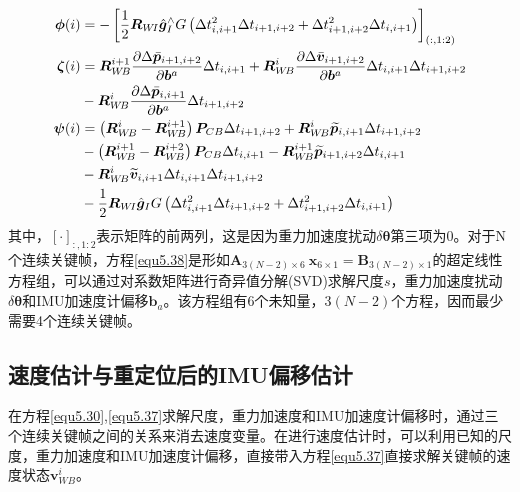 \begin{equation}
\label{equ5.39}
\begin{aligned}
\boldsymbol{\phi} (i)  &= - \left[ {1 \over 2} \boldsymbol{R}_{W\!I}\hat{\boldsymbol{g}}_I^{\wedge} G \left( \Delta t_{i,i+1}^2 \Delta t_{i+1,i+2}+  \Delta t_{i+1,i+2}^2 \Delta t_{i,i+1} \right) \right]_{(:,1:2)}
\\ 
\boldsymbol{\zeta} (i) &=  \boldsymbol{R}_{W\!B}^{i+1} {\partial \Delta \bar{\boldsymbol{p}}_{i+1,i+2} \over \partial \boldsymbol{b}^a } \Delta t_{i,i+1} + \boldsymbol{R}_{W\!B}^i {\partial \Delta \bar{\boldsymbol{v}}_{i+1,i+2} \over \partial \boldsymbol{b}^a } \Delta t_{i,i+1} \Delta t_{i+1,i+2} \\
 &- \boldsymbol{R}_{W\!B}^{i} {\partial \Delta \bar{\boldsymbol{p}}_{i,i+1} \over \partial \boldsymbol{b}^a } \Delta t_{i+1,i+2} 
\\  
\boldsymbol{\psi} (i) & = \left( \boldsymbol{R}_{W\!B}^{i} - \boldsymbol{R}_{W\!B}^{i+1} \right) \boldsymbol{P}_{CB} \Delta t_{i+1,i+2} + \boldsymbol{R}_{W\!B}^{i} \widetilde{\boldsymbol{p}}_{i,i+1} \Delta t_{i+1,i+2} \\
& - \left( \boldsymbol{R}_{W\!B}^{i+1} - \boldsymbol{R}_{W\!B}^{i+2} \right) \boldsymbol{P}_{CB} \Delta t_{i,i+1} - \boldsymbol{R}_{W\!B}^{i+1} \widetilde{\boldsymbol{p}}_{i+1,i+2} \Delta t_{i,i+1} \\ 
& - \boldsymbol{R}_{W\!B}^{i} \widetilde{\boldsymbol{v}}_{i,i+1}  \Delta t_{i,i+1} \Delta t_{i+1,i+2} \\
& - {1 \over 2} \boldsymbol{R}_{W\!I} \hat{\boldsymbol{g}}_I G \left( \Delta t_{i,i+1}^2 \Delta t_{i+1,i+2} + \Delta t_{i+1,i+2}^2 \Delta t_{i,i+1} \right)
\end{aligned}
\end{equation}
其中，$[\cdot]_{:,1:2}$表示矩阵的前两列，这是因为重力加速度扰动$\delta \boldsymbol{\theta}$第三项为0。对于N个连续关键帧，方程\eqref{equ5.38}是形如$\boldsymbol{A}_{3(N-2)\times 6}\  \boldsymbol{x}_{6\times 1} = \boldsymbol{B}_{3(N-2)\times 1}$的超定线性方程组，可以通过对系数矩阵进行奇异值分解(SVD)求解尺度$s$，重力加速度扰动$\delta \boldsymbol{\theta}$和IMU加速度计偏移$\boldsymbol{b}_a$。该方程组有6个未知量，$3(N-2)$个方程，因而最少需要4个连续关键帧。


\subsection{速度估计与重定位后的IMU偏移估计}
在方程\eqref{equ5.30},\eqref{equ5.37}求解尺度，重力加速度和IMU加速度计偏移时，通过三个连续关键帧之间的关系来消去速度变量。在进行速度估计时，可以利用已知的尺度，重力加速度和IMU加速度计偏移，直接带入方程\eqref{equ5.37}直接求解关键帧的速度状态$\boldsymbol{v}_{W\!B}^i$。

